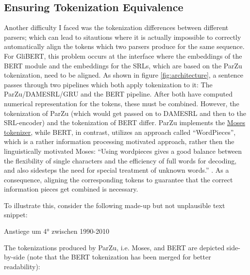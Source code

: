 \subsection{Ensuring Tokenization Equivalence}

Another difficulty I faced was the tokenization differences between different parsers; which can
lead to sitautions where it is actually impossible to correctly automatically align the tokens
which two parsers produce for the same sequence.
For GliBERT, this problem occurs at the interface where the embeddings of the BERT
module and the embeddings for the SRLs, which are based on the ParZu tokenization,
need to be aligned. As shown in figure \ref{fig:architecture}, a sentence passes
through two pipelines which both apply tokenization to it: The ParZu/DAMESRL/GRU
and the BERT pipeline. After both have computed numerical representation for the
tokens, these must be combined. However, the tokenization of ParZu (which would
get passed on to DAMESRL and then to the SRL-encoder) and the tokenization of BERT
differ. ParZu implements the \href{http://www.statmt.org/moses/}{Moses tokenizer},
while BERT, in contrast, utilizes an approach called ``WordPieces'', which is a
rather information processing motivated approach, rather then the linguistically
motivated Moses: ``Using wordpieces gives a good balance between the flexibility of
single characters and the efficiency of full words for decoding, and also sidesteps
the need for special treatment of unknown words.'' \citep[p.~2]{wu2016google}. As
a consequence, aligning the corresponding tokens to guarantee that the correct
information pieces get combined is necessary.

To illustrate this, consider the following made-up but not unplausible text snippet:

\begin{examples}
	\item \label{itm:tok-sentence} Anstiege um 4° zwischen 1990-2010
\end{examples}

The tokenizations produced by ParZu, i.e. Moses, and BERT are
depicted side-by-side (note that the BERT tokenization has been
merged for better readability):

